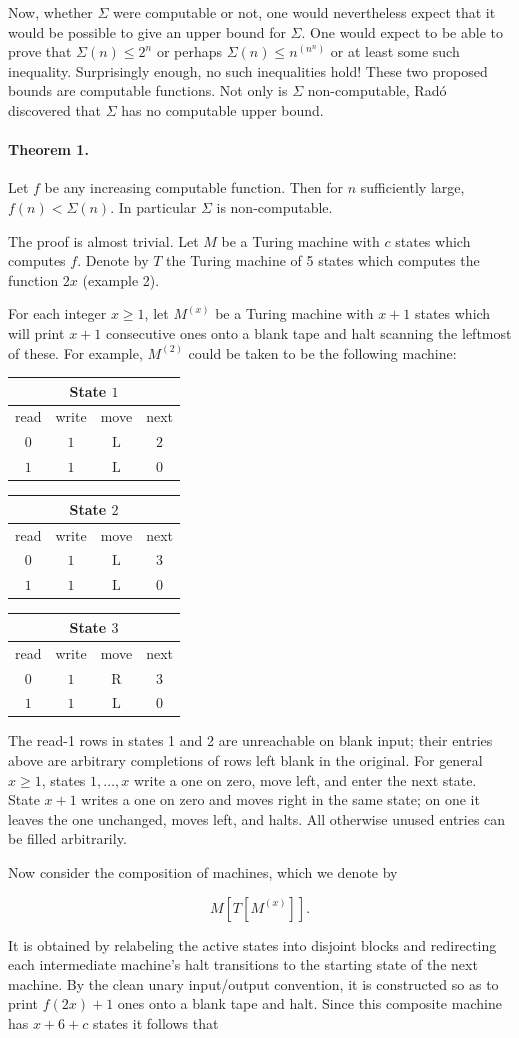 \documentclass[11pt]{article}
\makeatletter
\newcommand{\origpage}[1]{\marginnote{\footnotesize\textbf{[#1]}}}
\newcommand{\card}[7]{%
\begingroup\setlength{\tabcolsep}{4.1pt}\renewcommand{\arraystretch}{1.13}%
\begin{tabular}{@{}c|ccc@{}}\multicolumn{4}{c}{\textbf{State $#1$}}\\
\toprule
\scriptsize read & \scriptsize write & \scriptsize move & \scriptsize next\\
\midrule
$0$ & $#2$ & $\mathrm{#3}$ & $#4$\\
$1$ & $#5$ & $\mathrm{#6}$ & $#7$\\
\bottomrule
\end{tabular}\endgroup}
\makeatother
\begin{document}
Now, whether $\Sigma$ were computable or not, one would nevertheless expect that it would be possible to give an upper bound for $\Sigma$. One would expect to be able to prove that $\Sigma(n) \leq 2^{n}$ or perhaps $\Sigma(n) \leq n^{\left(n^{n}\right)}$ or at least some such inequality. Surprisingly enough, no such inequalities hold! These two proposed bounds are computable functions. Not only is $\Sigma$ non-computable, Radó discovered \cite{r32} that $\Sigma$ has no computable upper bound.

\paragraph{Theorem 1.} Let $f$ be any increasing computable function. Then for $n$ sufficiently large, $f(n)<\Sigma(n)$. In particular $\Sigma$ is non-computable.

The proof is almost trivial. Let $M$ be a Turing machine with $c$ states which computes $f$. Denote by $T$ the Turing machine of 5 states which computes the function $2 x$ (example 2).

For each integer $x\geq1$, let $M^{(x)}$ be a Turing machine with $x+1$ states which will print $x+1$ consecutive ones onto a blank tape and halt scanning the leftmost of these. For example, $M^{(2)}$ could be taken to be the following machine:
\begin{center}
\card{1}{1}{L}{2}{1}{L}{0}\qquad
\card{2}{1}{L}{3}{1}{L}{0}\qquad
\card{3}{1}{R}{3}{1}{L}{0}
\end{center}
The read-1 rows in states 1 and 2 are unreachable on blank input; their
entries above are arbitrary completions of rows left blank in the original.
For general $x\geq1$, states $1,\ldots,x$ write a one on zero, move left,
and enter the next state. State $x+1$ writes a one on zero and moves right
in the same state; on one it leaves the one unchanged, moves left, and halts.
All otherwise unused entries can be filled arbitrarily.

\origpage{734}Now consider the composition of machines, which we denote by

\[
M\left[T\left[M^{(x)}\right]\right] .
\]

It is obtained by relabeling the active states into disjoint blocks and redirecting each intermediate machine's halt transitions to the starting state of the next machine. By the clean unary input/output convention, it is constructed so as to print $f(2 x)+1$ ones onto a blank tape and halt. Since this composite machine has $x+6+c$ states it follows that
\end{document}
